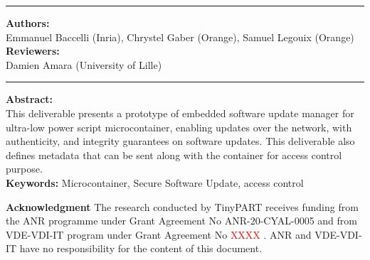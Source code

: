 \begin{titlepage}
			
			\begin{center}
	
			\rule{0.5\linewidth}{1pt}
			
			\end{center}
		
			\vspace{0.5cm}
			
			\textbf{Authors: }\\
			Emmanuel Baccelli (Inria), Chrystel Gaber (Orange), Samuel Legouix (Orange) \\%

	
	

			
			\textbf{Reviewers: }\\
			Damien Amara (University of Lille)\\  
						
			\begin{center}
	
				\rule{0.5\linewidth}{1pt}
	
			\end{center}

			\vspace{0.25cm}
			
			\textbf{Abstract: }\\
			This deliverable presents a prototype of embedded software update manager for ultra-low power script microcontainer, enabling updates over the network, with authenticity, and integrity guarantees on software updates. This deliverable also defines metadata that can be sent along with the container for access control purpose.\\
			
			
			\textbf{Keywords:} Microcontainer, Secure Software Update, access control\\		
			
			\vfill
			
			\begin{center}

					\small \textbf{Acknowledgment}
					The research conducted by TinyPART receives funding from the ANR programme under Grant Agreement No ANR-20-CYAL-0005 and from VDE-VDI-IT program under Grant Agreement No \textcolor{red}{XXXX} . ANR and VDE-VDI-IT have no responsibility for the content of this document. \\
				

\end{center}
\end{titlepage}
